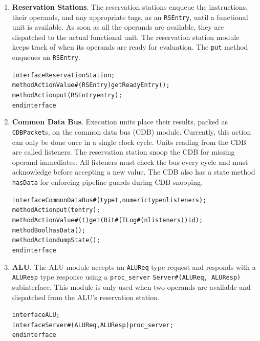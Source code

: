 \documentclass[12pt]{article}
\begin{document}
\begin{enumerate}

    \item \textbf{Reservation Stations}. The reservation stations enqueue the instructions, their operands, and 
    any appropriate tags, as an \verb=RSEntry=, until a functional unit is available. As soon as all the operands
    are available, they are dispatched to the actual functional unit. The reservation station module keeps track
    of when its operands are ready for evaluation. The \verb=put= method enqueues an \verb=RSEntry=. 
    \begin{alltt}
        interface ReservationStation;
          method ActionValue#(RSEntry) getReadyEntry();
          method Action put(RSEntry entry);
        endinterface
    \end{alltt}
    
    \item \textbf{Common Data Bus}. Execution units place their results, packed as \verb=CDBPacket=s, on 
    the common data bus (CDB) module. Currently, this action can only be done once in a single clock cycle.
    Units reading from the CDB are called listeners. The reservation station snoop the CDB for missing operand 
    immediates. All listeners must check the bus every cycle and must acknowledge before accepting a new value.
    The CDB also has a state method \verb=hasData= for enforcing pipeline guards during CDB snooping. 
    \begin{alltt}
        interface CommonDataBus#(type t, numeric type nlisteners);
          method Action put(t entry);
          method ActionValue#(t) get(Bit#(TLog#(nlisteners)) id);
          method Bool hasData();
          method Action dumpState();
        endinterface
    \end{alltt}
    
    \item \textbf{ALU}. The ALU module accepts an \verb=ALUReq= type request and responds with a \verb=ALUResp= 
    type response using a \verb=proc_server= \verb=Server#(ALUReq, ALUResp)= subinterface. This module is only 
    used when two operands are available and dispatched from the ALU's reservation station. 
    \begin{alltt}
        interface ALU;
            interface Server#(ALUReq, ALUResp) proc_server;
        endinterface
    \end{alltt}
    

\end{enumerate}
\end{document}
